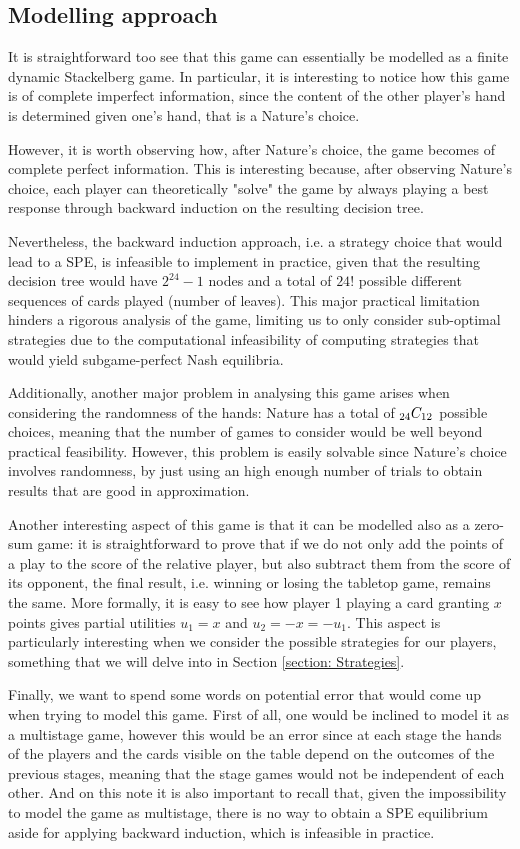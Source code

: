 \subsection{Modelling approach}

It is straightforward too see that this game can essentially be modelled as a finite dynamic Stackelberg game.
In particular, it is interesting to notice how this game is of complete imperfect information, since the content of the other player's hand is determined given one's hand, that is a Nature's choice.

However, it is worth observing how, after Nature's choice, the game becomes of complete perfect information.
This is interesting because, after observing Nature's choice, each player can theoretically "solve" the game by always playing a best response through backward induction on the resulting decision tree.

Nevertheless, the backward induction approach, i.e. a strategy choice that would lead to a SPE, is infeasible to implement in practice, given that the resulting decision tree would have $2^24 - 1$ nodes and a total of $24!$ possible different sequences of cards played (number of leaves).
This major practical limitation hinders a rigorous analysis of the game, limiting us to only consider sub-optimal strategies due to the computational infeasibility of computing strategies that would yield subgame-perfect Nash equilibria.

Additionally, another major problem in analysing this game arises when considering the randomness of the hands: Nature has a total of ${}_{24}C_{12}$ possible choices, meaning that the number of games to consider would be well beyond practical feasibility.
However, this problem is easily solvable since Nature's choice involves randomness, by just using an high enough number of trials to obtain results that are good in approximation.

Another interesting aspect of this game is that it can be modelled also as a zero-sum game: it is straightforward to prove that if we do not only add the points of a play to the score of the relative player, but also subtract them from the score of its opponent, the final result, i.e. winning or losing the tabletop game, remains the same. More formally, it is easy to see how player 1 playing a card granting $x$ points gives partial utilities $u_1 = x$ and $u_2 = -x = -u_1$.
This aspect is particularly interesting when we consider the possible strategies for our players, something that we will delve into in Section \ref{section: Strategies}.

Finally, we want to spend some words on potential error that would come up when trying to model this game.
First of all, one would be inclined to model it as a multistage game, however this would be an error since at each stage the hands of the players and the cards visible on the table depend on the outcomes of the previous stages, meaning that the stage games would not be independent of each other.
And on this note it is also important to recall that, given the impossibility to model the game as multistage, there is no way to obtain a SPE equilibrium aside for applying backward induction, which is infeasible in practice.
